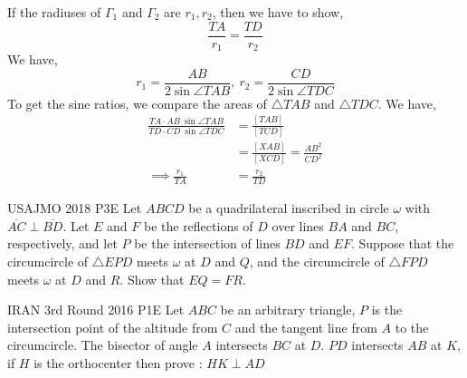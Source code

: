 \begin{minipage}{.5\linewidth}
    \begin{solution}
        If the radiuses of $ \Gamma_1 $ and $ \Gamma_2 $ are $ r_1, r_2 $, then we
        have to show,
        \[\frac{TA}{r_1}=\frac{TD}{r_2}\]
        We have, 
        \[r_1= \frac{AB}{2\sin\angle TAB},\ r_2= \frac{CD}{2\sin\angle TDC}\]
        To get the sine ratios, we compare the areas of $ \triangle TAB $ and $
        \triangle TDC $. We have, 
        \[\begin{aligned}
            \frac{TA\cdot AB\ \sin\angle TAB}{TD\cdot CD\ \sin\angle TDC} &=
            \frac{[TAB]}{[TCD]}\\
            &= \frac{[XAB]}{[XCD]} = \frac{AB^2}{CD^2}\\[.7em]
            \implies \frac{r_1}{TA}&=\frac{r_2}{TD}
        \end{aligned}\]
    \end{solution}
\end{minipage}\hfill%
\begin{minipage}{.5\linewidth}
\end{minipage}

\begin{minipage}{.5\linewidth}
    {USAJMO 2018 P3}{E}{
        Let $ABCD$ be a quadrilateral inscribed in circle $\omega$ with
        $\overline{AC} \perp \overline{BD}$. Let $E$ and $F$ be the
        reflections of $D$ over lines $BA$ and $BC$, respectively, and let $P$
        be the intersection of lines $BD$ and $EF$. Suppose that the
        circumcircle of $\triangle EPD$ meets $\omega$ at $D$ and $Q$, and the
        circumcircle of $\triangle FPD$ meets $\omega$ at $D$ and $R$. Show
        that $EQ = FR$.
    } 
\end{minipage}\hfill%
\begin{minipage}{.45\linewidth}
\end{minipage}


{IRAN 3rd Round 2016 P1}{E}{
    Let $ABC$ be an arbitrary triangle, $P$ is the intersection
    point of the altitude from $C$ and the tangent line from $A$ to the
    circumcircle. The bisector of angle $A$ intersects $BC$ at $D$. $PD$
    intersects $AB$ at $K$, if $H$ is the orthocenter then prove : $HK\perp AD$
}

